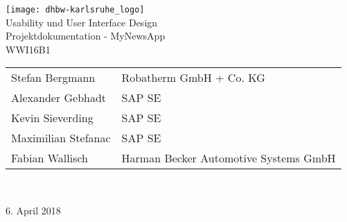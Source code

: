 
\begin{titlepage}
   \pagestyle{empty}
   \centering
   \texttt{[image: dhbw-karlsruhe\_logo]}\qquad
   \mbox{}\vspace{4\baselineskip}\\
   \rmfamily\Large
   \centering
   Usability und User Interface Design
   \vspace{1\baselineskip}\\
   \sffamily\huge
   \centering
   Projektdokumentation - MyNewsApp
   \vspace{1\baselineskip}\\
   \rmfamily
   \large
   WWI16B1
   \normalsize
   \vspace{3\baselineskip}\\

   \begin{tabular}{l l}

     Stefan Bergmann & Robatherm GmbH + Co. KG \\
     Alexander Gebhadt & SAP SE \\
     Kevin Sieverding & SAP SE \\
     Maximilian Stefanac & SAP SE \\
     Fabian Wallisch & Harman Becker Automotive Systems GmbH \\

   \end{tabular}

   \vspace{3\baselineskip}\\

   \large

   6. April 2018


\end{titlepage}
